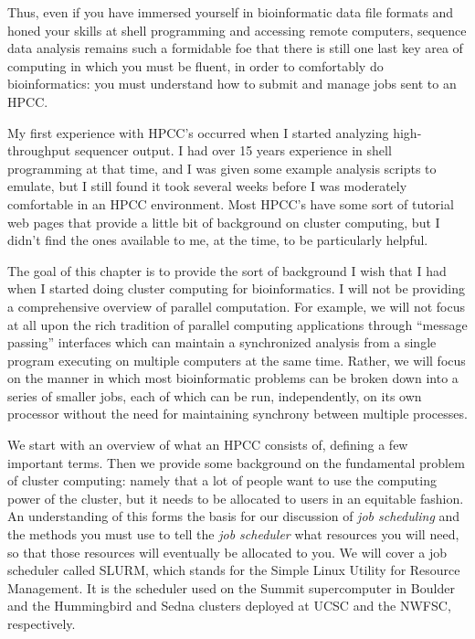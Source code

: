 \documentclass[]{krantz}
\begin{document}
Thus, even if you have immersed yourself in bioinformatic data file formats and honed
your skills at shell programming and accessing remote computers, sequence data analysis
remains such a formidable foe that there is still one last key area of computing
in which you must be fluent, in order to comfortably do bioinformatics: you must understand
how to submit and manage jobs sent to an HPCC.

My first experience with HPCC's occurred when I started analyzing
high-throughput sequencer output. I had over 15 years experience in shell
programming at that time, and I was given some example analysis scripts to emulate, but I still
found it took several weeks before I was moderately comfortable in an HPCC environment. Most
HPCC's have some sort of tutorial web pages that provide a little bit of background
on cluster computing, but I didn't find the ones available to me, at the time, to
be particularly helpful.

The goal of this chapter is to provide the sort of background I wish that I had
when I started doing cluster computing for bioinformatics. I will not be providing
a comprehensive overview of parallel computation. For example, we will not focus at all
upon the rich tradition of parallel computing applications through ``message passing'' interfaces which
can maintain a synchronized analysis from a single program executing
on multiple computers at the same time. Rather, we will focus on the manner in which
most bioinformatic problems can be broken down into a series of smaller jobs,
each of which can be run, independently, on its own processor without the
need for maintaining synchrony between multiple processes.

We start with an overview of what an HPCC consists of, defining a few important
terms. Then we provide some background on the fundamental problem of cluster
computing: namely that a lot of people want to use the computing power of the cluster,
but it needs to be allocated to users in an equitable fashion. An understanding of this
forms the basis for our discussion of \emph{job scheduling} and the methods you must
use to tell the \emph{job scheduler} what resources you will need, so that those resources
will eventually be allocated to you. We will cover a job scheduler called SLURM, which
stands for the Simple Linux Utility for Resource Management. It is the scheduler used
on the Summit supercomputer in Boulder and the Hummingbird and Sedna clusters deployed
at UCSC and the NWFSC, respectively.
\end{document}
